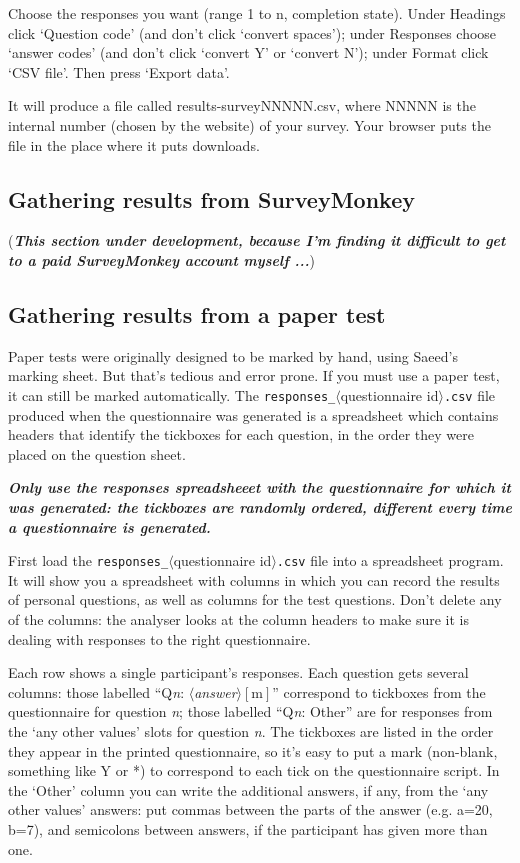 \documentclass[11pt,a4paper]{article}
\newcommand{\rbsubparagraph}{}
\newcommand{\seclabel}[1]{\label{sec:#1}}
\begin{document}
\rbsubparagraph{}
Choose the responses you want (range 1 to n, completion state). Under Headings click `Question code' (and don't click `convert spaces'); under Responses choose `answer codes' (and don't click `convert Y' or `convert N'); under Format click `CSV file'. Then press `Export data'.

\rbsubparagraph{}
It will produce a file called results-surveyNNNNN.csv, where NNNNN is the internal number (chosen by the website) of your survey. Your browser puts the file in the place where it puts downloads. 

\subsection{Gathering results from SurveyMonkey}

(\textbf{\textit{This section under development, because I'm finding it difficult to get to a paid SurveyMonkey account myself ...}})

\subsection{Gathering results from a paper test}
\seclabel{paperresults}

\rbsubparagraph{}
Paper tests were originally designed to be marked by hand, using Saeed's marking sheet. But that's tedious and error prone. If you must use a paper test, it can still be marked automatically. The \texttt{responses\_}$\langle$questionnaire id$\rangle$\texttt{.csv} file produced when the questionnaire was generated is a spreadsheet which contains headers that identify the tickboxes for each question, in the order they were placed on the question sheet. 

\rbsubparagraph{}
\textbf{\textit{Only use the responses spreadsheeet with the questionnaire for which it was generated: the tickboxes are randomly ordered, different every time a questionnaire is generated.}}

\rbsubparagraph{}
First load the \texttt{responses\_}$\langle$questionnaire id$\rangle$\texttt{.csv} file into a spreadsheet program. It will show you a spreadsheet with columns in which you can record the results of personal questions, as well as columns for the test questions. Don't delete any of the columns: the analyser looks at the column headers to make sure it is dealing with responses to the right questionnaire.

\rbsubparagraph{}
Each row shows a single participant's responses. Each question gets several columns: those labelled ``Q\textit{n}: $\langle$\textit{answer}$\rangle [\text{m}]$'' correspond to tickboxes from the questionnaire for question \textit{n}; those labelled ``Q\textit{n}: Other'' are for responses from the `any other values' slots for question \textit{n}. The tickboxes are listed in the order they appear in the printed questionnaire, so it's easy to put a mark (non-blank, something like Y or *) to correspond to each tick on the questionnaire script. In the `Other' column you can write the additional answers, if any, from the `any other values' answers: put commas between the parts of the answer (e.g. a=20, b=7), and semicolons between answers, if the participant has given more than one.
\end{document}
